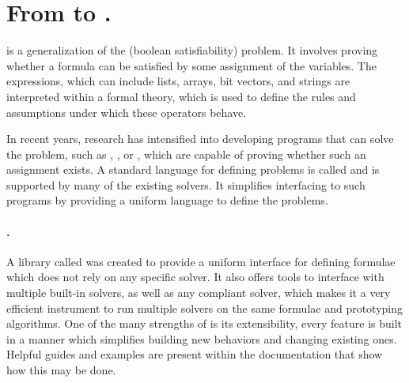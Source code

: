 \section{From \smt{} to \vmt{}.}

\SMT{} is a generalization of the \sat{} (boolean satisfiability) problem.
It involves proving whether a formula can be satisfied by some assignment of the variables.
The expressions, which can include lists, arrays, bit vectors, and strings are interpreted within a formal theory, which is used to define the rules and assumptions under which these operators behave.

In recent years, research has intensified into developing programs that can solve the \smt{} problem, such as \zthree{} \cite{DBLP:conf/tacas/MouraB08}, \yices{} \cite{DBLP:conf/cav/Dutertre14}, or \mathsat{} \cite{DBLP:conf/tacas/CimattiGSS13}, which are capable of proving whether such an assignment exists.
A standard language for defining \smt{} problems is called \smtlib{} \cite{SMT-LIB} and is supported by many of the existing solvers.
It simplifies interfacing to such programs by providing a uniform language to define the problems.

\paragraph*{\pysmt{}.}
A \python{} library called \pysmt{} \cite{pysmt2015} was created to provide a uniform interface for defining \smt{} formulae which does not rely on any specific solver.
It also offers tools to interface with multiple built-in solvers, as well as any \smtlib{} compliant solver, which makes it a very efficient instrument to run multiple solvers on the same formulae and prototyping algorithms.
One of the many strengths of \pysmt{} is its extensibility, every feature is built in a manner which simplifies building new behaviors and changing existing ones.
Helpful guides and examples are present within the documentation that show how this may be done.

